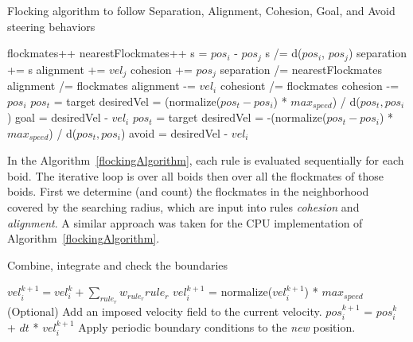 \begin{algorithm}
\caption{Flocking algorithm to follow Separation, Alignment, Cohesion, Goal, and Avoid steering behaviors}
\label{flockingAlgorithm}
\begin{algorithmic}
	\STATE flockmates++
				\STATE nearestFlockmates++
				\STATE s = $pos_i$ - $pos_j$ 
				\STATE s /= d($pos_i$, $pos_j$) 
				\STATE separation += s
			\ENDIF
		\ENDIF
			\STATE alignment += $vel_j$
		\ENDIF
			\STATE cohesion += $pos_j$
		\ENDIF
	\ENDIF
\ENDFOR
{}
	\STATE separation /= nearestFlockmates
\ENDIF
{}
	\STATE alignment /=  flockmates
	\STATE alignment -= $vel_i$
\ENDIF
{}
	\STATE cohesiont /=  flockmates
	\STATE cohesion -= $pos_i$
\ENDIF
{}
	\STATE $pos_t$ = target
	\STATE desiredVel = (normalize($pos_t - pos_i$) * $max_{speed}$) / d($pos_t, pos_i$) 
	\STATE goal = desiredVel - $vel_i$
\ENDIF
{}
	\STATE $pos_t$ = target
	\STATE desiredVel = -(normalize($pos_t - pos_i$) * $max_{speed}$) / d($pos_t, pos_i$) 
	\STATE avoid = desiredVel - $vel_i$
\ENDIF

\end{algorithmic}
\end{algorithm}

In the Algorithm~\ref{flockingAlgorithm}, each rule is evaluated sequentially for each boid. The iterative loop is over all boids then over all the flockmates of those boids. First we determine (and count) the flockmates in the neighborhood covered by the searching radius, which are input into rules \textit{cohesion} and \textit{alignment}. A similar approach was taken for the CPU implementation of Algorithm~\ref{flockingAlgorithm}.

\begin{algorithm}
\caption{Combine, integrate and check the boundaries}
\label{combineAlgorithm}
\begin{algorithmic}
\STATE $vel_i^{k+1} = vel_i^{k} + \sum_{rule_r} w_{rule_r} {rule_r} $
	\STATE $vel_i^{k+1}$ = normalize($vel_i^{k+1}$) * $max_{speed}$
\ENDIF  
\STATE (Optional) Add an imposed velocity field to the current velocity.
\STATE $pos_i^{k+1}$ = $pos_i^{k}$ + $dt$ * $vel_i^{k+1}$
\STATE Apply periodic boundary conditions to the \textit{new} position.
\end{algorithmic}
\end{algorithm}

